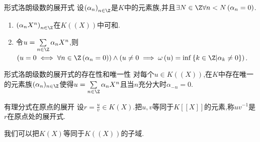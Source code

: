 \begin{proposition}{形式洛朗级数的展开式}{}
	设$\left(\alpha_{n}\right)_{n\in\Z}$是$K$中的元素族,并且$\exists N\in\Z\forall n<N\left(\alpha_{n}=0\right)$.
	\begin{enumerate}
		\item $\left(\alpha_{n}X^{n}\right)_{n\in\Z}$在$K((X))$中可和.
		\item 令$u=\sum\limits_{n\in\Z}\alpha_{n}X^{n}$,则$\left(u=0\iff\forall n\in\Z\left(\alpha_{n}=0\right)\right)\wedge\left(u\neq 0\implies\omega\left(u\right)=\inf\left\{k\in\Z\middle|\alpha_{k}\neq 0\right\}\right)$.
	\end{enumerate}
\end{proposition}

\begin{theorem}{形式洛朗级数的展开式的存在性和唯一性}{}
	对每个$u\in K((X))$,在$K$中存在唯一的元素族$(\alpha_{n})_{n\in\Z}$使得$u=\sum\limits_{n\in\Z}\alpha_{n}X^{n}$且当$n$充分大时$\alpha_{-n}=0$.
\end{theorem}

\begin{definition}{有理分式在原点的展开}{}
	设$r=\frac{u}{v}\in K(X)$.把$u,v$等同于$K[[X]]$的元素,称$uv^{-1}$是$r$在原点处的展开式.
\end{definition}

\begin{remark}{}{}
	我们可以把$K(X)$等同于$K((X))$的子域.
\end{remark}










